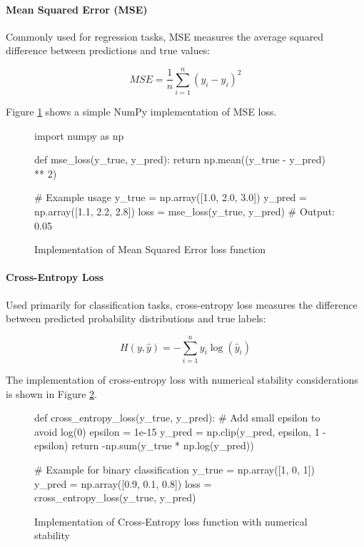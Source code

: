 \paragraph{Mean Squared Error (MSE)}
Commonly used for regression tasks, MSE measures the average squared difference between predictions and true values:

\[ MSE = \frac{1}{n}\sum_{i=1}^n (y_i - \hat{y}_i)^2 \]

Figure \ref{fig:mse_implementation} shows a simple NumPy implementation of MSE loss.

\begin{figure}[h]
\begin{pythoncode}
import numpy as np

def mse_loss(y_true, y_pred):
    return np.mean((y_true - y_pred) ** 2)

# Example usage
y_true = np.array([1.0, 2.0, 3.0])
y_pred = np.array([1.1, 2.2, 2.8])
loss = mse_loss(y_true, y_pred)  # Output: 0.05
\end{pythoncode}
\caption{Implementation of Mean Squared Error loss function}
\label{fig:mse_implementation}
\end{figure}

\paragraph{Cross-Entropy Loss}
Used primarily for classification tasks, cross-entropy loss measures the difference between predicted probability distributions and true labels:

\[ H(y, \hat{y}) = -\sum_{i=1}^n y_i \log(\hat{y}_i) \]

The implementation of cross-entropy loss with numerical stability considerations is shown in Figure \ref{fig:cross_entropy_implementation}.

\begin{figure}[h]
\begin{pythoncode}
def cross_entropy_loss(y_true, y_pred):
    # Add small epsilon to avoid log(0)
    epsilon = 1e-15
    y_pred = np.clip(y_pred, epsilon, 1 - epsilon)
    return -np.sum(y_true * np.log(y_pred))

# Example for binary classification
y_true = np.array([1, 0, 1])
y_pred = np.array([0.9, 0.1, 0.8])
loss = cross_entropy_loss(y_true, y_pred)
\end{pythoncode}
\caption{Implementation of Cross-Entropy loss function with numerical stability}
\label{fig:cross_entropy_implementation}
\end{figure}


